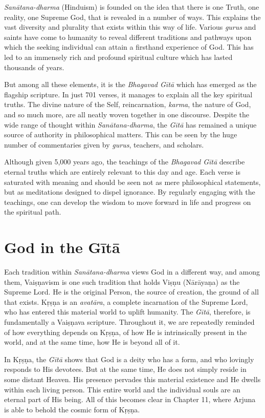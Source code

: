 \documentclass[12pt, twoside, openright]{memoir}
\begin{document}
\textit{Sanātana-dharma} (Hinduism) is founded on the idea that there is one Truth, one reality, one Supreme God, that is revealed in a number of ways. This explains the vast diversity and plurality that exists within this way of life. Various \textit{gurus} and saints have come to humanity to reveal different traditions and pathways upon which the seeking individual can attain a firsthand experience of God. This has led to an immensely rich and profound spiritual culture which has lasted thousands of years.

But among all these elements, it is the \textit{Bhagavad Gītā} which has emerged as the flagship scripture. In just 701 verses, it manages to explain all the key spiritual truths. The divine nature of the Self, reincarnation, \textit{karma}, the nature of God, and so much more, are all neatly woven together in one discourse. Despite the wide range of thought within \textit{Sanātana-dharma}, the \textit{Gītā} has remained a unique source of authority in philosophical matters. This can be seen by the huge number of commentaries given by \textit{gurus}, teachers, and scholars.

Although given 5,000 years ago, the teachings of the \textit{Bhagavad Gītā} describe eternal truths which are entirely relevant to this day and age. Each verse is saturated with meaning and should be seen not as mere philosophical statements, but as meditations designed to dispel ignorance. By regularly engaging with the teachings, one can develop the wisdom to move forward in life and progress on the spiritual path.

\section{God in the Gītā}\label{sec-god-in-the-gita}

Each tradition within \textit{Sanātana-dharma} views God in a different way, and among them, Vaiṣṇavism is one such tradition that holds Viṣṇu (Nārāyaṇa) as the Supreme Lord. He is the original Person, the source of creation, the ground of all that exists. Kṛṣṇa is an \textit{avatāra}, a complete incarnation of the Supreme Lord, who has entered this material world to uplift humanity. The \textit{Gītā}, therefore, is fundamentally a Vaiṣṇava scripture. Throughout it, we are repeatedly reminded of how everything depends on Kṛṣṇa, of how He is intrinsically present in the world, and at the same time, how He is beyond all of it.

In Kṛṣṇa, the \textit{Gītā} shows that God is a deity who has a form, and who lovingly responds to His devotees. But at the same time, He does not simply reside in some distant Heaven. His presence pervades this material existence and He dwells within each living person. This entire world and the individual souls are an eternal part of His being. All of this becomes clear in Chapter 11, where Arjuna is able to behold the cosmic form of Kṛṣṇa.
\end{document}
